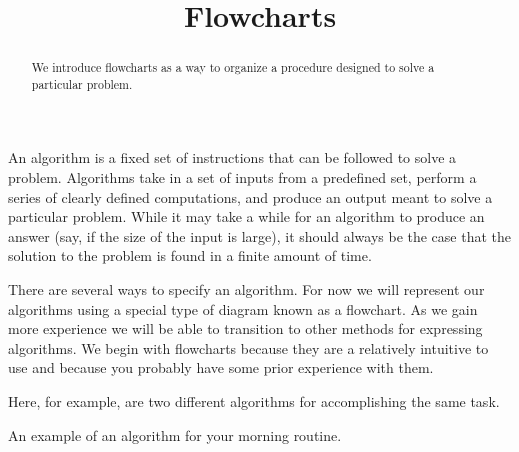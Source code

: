 \documentclass{ximera}
\title{Flowcharts}
\begin{document}
  
\begin{abstract}  
We introduce flowcharts as a way to organize a procedure designed to solve a particular problem.
\end{abstract}  
\maketitle

An algorithm is a fixed set of instructions that can be followed to solve a problem. Algorithms take in a set of inputs from a predefined set, perform a series of clearly defined computations, and produce an output meant to solve a particular problem. While it may take a while for an algorithm to produce an answer (say, if the size of the input is large), it should always be the case that the solution to the problem is found in a finite amount of time.


There are several ways to specify an algorithm. For now we will represent our algorithms using a special type of diagram known as a flowchart. As we gain more experience we will be able to transition to other methods for expressing algorithms. We begin with flowcharts because they are a relatively intuitive to use and because you probably have some prior experience with them.


Here, for example, are two different algorithms for accomplishing the same task. 

\begin{image}
\end{image}

\begin{center}
	An example of an algorithm for your morning routine.
\end{center}

\begin{image}
\end{image}
\end{document}
